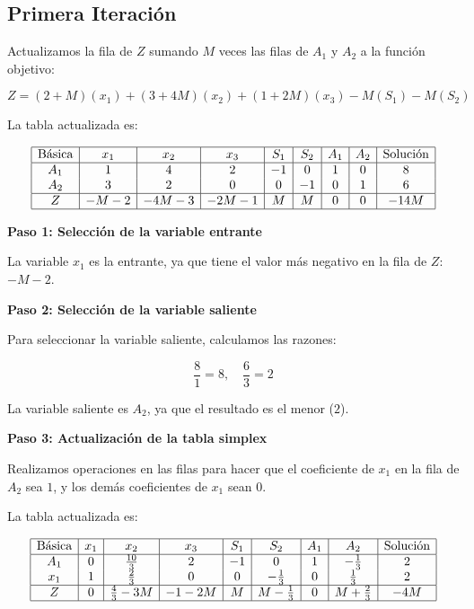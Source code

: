 \documentclass{article}
\begin{document}
\subsection*{Primera Iteración}

Actualizamos la fila de \(Z\) sumando \(M\) veces las filas de \(A_1\) y \(A_2\) a la función objetivo:

\[
Z = (2 + M)(x_1) + (3 + 4M)(x_2) + (1 + 2M)(x_3) - M(S_1) - M(S_2)
\]

La tabla actualizada es:

\[
\begin{array}{|c|c|c|c|c|c|c|c|c|}
\hline
\text{Básica} & x_1 & x_2 & x_3 & S_1 & S_2 & A_1 & A_2 & \text{Solución} \\
\hline
A_1 & 1 & 4 & 2 & -1 & 0 & 1 & 0 & 8 \\
A_2 & 3 & 2 & 0 & 0 & -1 & 0 & 1 & 6 \\
\hline
Z & -M-2 & -4M-3 & -2M-1 & M & M & 0 & 0 & -14M \\
\hline
\end{array}
\]

\textbf{Paso 1: Selección de la variable entrante}

La variable \(x_1\) es la entrante, ya que tiene el valor más negativo en la fila de \(Z\): \(-M - 2\).

\textbf{Paso 2: Selección de la variable saliente}

Para seleccionar la variable saliente, calculamos las razones:

\[
\frac{8}{1} = 8, \quad \frac{6}{3} = 2
\]

La variable saliente es \(A_2\), ya que el resultado es el menor (\(2\)).

\textbf{Paso 3: Actualización de la tabla simplex}

Realizamos operaciones en las filas para hacer que el coeficiente de \(x_1\) en la fila de \(A_2\) sea \(1\), y los demás coeficientes de \(x_1\) sean \(0\).

La tabla actualizada es:

\[
\begin{array}{|c|c|c|c|c|c|c|c|c|}
\hline
\text{Básica} & x_1 & x_2 & x_3 & S_1 & S_2 & A_1 & A_2 & \text{Solución} \\
\hline
A_1 & 0 & \frac{10}{3} & 2 & -1 & 0 & 1 & -\frac{1}{3} & 2 \\
x_1 & 1 & \frac{2}{3} & 0 & 0 & -\frac{1}{3} & 0 & \frac{1}{3} & 2 \\
\hline
Z & 0 & \frac{4}{3} - 3M & -1 - 2M & M & M - \frac{1}{3} & 0 & M + \frac{2}{3} & -4M \\
\hline
\end{array}
\]
\end{document}

